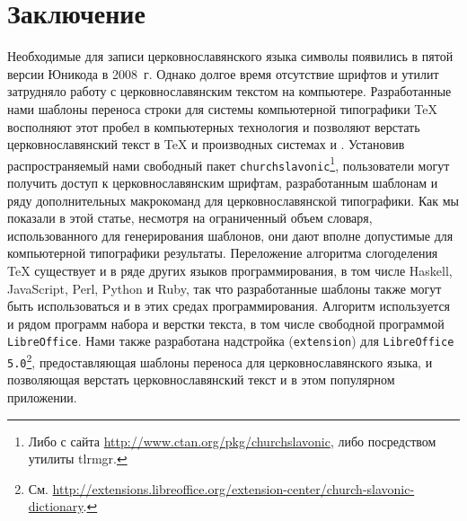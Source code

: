 \documentclass[12pt,a4paper,oneside]{extarticle}
\begin{document}
\section{Заключение}

Необходимые для записи церковнославянского языка символы появились в пятой версии Юникода в 2008~г. Однако долгое время отсутствие шрифтов и утилит затрудняло работу с церковнославянским текстом на компьютере. Разработанные нами шаблоны переноса строки для системы компьютерной типографики \TeX{} восполняют этот пробел в компьютерных технология и позволяют верстать церковнославянский текст в \TeX{} и производных системах \XeTeX{} и \LuaTeX{}. Установив распространяемый нами свободный пакет \verb+churchslavonic+\footnote{Либо с сайта \url{http://www.ctan.org/pkg/churchslavonic}, либо посредством утилиты tlrmgr.}, пользователи могут получить доступ к церковнославянским шрифтам, разработанным шаблонам и ряду дополнительных макрокоманд для церковнославянской типографики. Как мы показали в этой статье, несмотря на ограниченный объем словаря, использованного для генерирования шаблонов, они дают вполне допустимые для компьютерной типографики результаты. Переложение алгоритма слогоделения \TeX{}  существует и в ряде других языков программирования, в том числе Haskell, JavaScript, Perl, Python и Ruby, так что разработанные шаблоны также могут быть использоваться и в этих средах программирования. Алгоритм используется и рядом программ набора и верстки текста, в том числе свободной программой \verb+LibreOffice+. Нами также разработана надстройка (\verb+extension+) для \verb+LibreOffice 5.0+\footnote{См. \url{http://extensions.libreoffice.org/extension-center/church-slavonic-dictionary}.}, предоставляющая шаблоны переноса для церковнославянского языка, и позволяющая верстать церковнославянский текст и в этом популярном приложении.

\printbibliography
\end{document}
